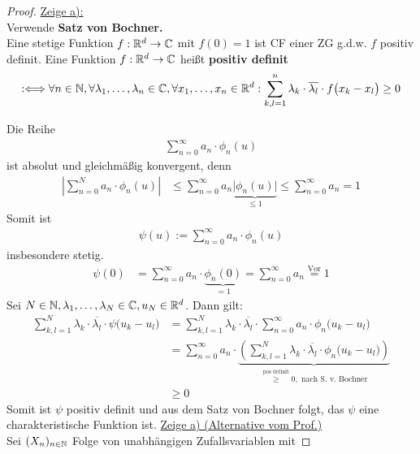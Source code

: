 \documentclass[12pt,a4paper]{article}
\begin{document}
\begin{proof}
	\underline{Zeige a):}\\
	Verwende
	\textbf{Satz von Bochner.}\\
		Eine stetige Funktion $f:\mathbb{R}^d\to\mathbb{C}$ mit $f(0)=1$ ist CF einer ZG g.d.w. $f$ positiv definit.\nl
	Eine Funktion $f:\mathbb{R}^d\to\mathbb{C}$ heißt \textbf{positiv definit}
	\begin{align*}
		:\Longleftrightarrow
		\forall n\in\mathbb{N},\forall\lambda_1,\ldots,\lambda_n\in\mathbb{C},\forall x_1,\ldots,x_n\in\mathbb{R}^d:
		\sum\limits_{k,l=1}^n\lambda_k\cdot\overline{\lambda_l}\cdot f\big(x_k-x_l\big)\geq0
	\end{align*}
	
	Die Reihe
	\begin{align*}
		\sum\limits_{n=0}^\infty a_n\cdot\phi_n(u)
	\end{align*}
	ist absolut und gleichmäßig konvergent, denn
	\begin{align*}
		\left|\sum\limits_{n=0}^N a_n\cdot\phi_n(u)\right|
		&\leq\sum\limits_{n=0}^\infty a_n\underbrace{\big|\phi_n(u)\big|}_{\leq1}
		\leq\sum\limits_{n=0}^\infty a_n=1
	\end{align*}
	Somit ist
	\begin{align*}
		\psi(u):=\sum\limits_{n=0}^\infty a_n\cdot\phi_n(u)
	\end{align*}
	insbesondere stetig.
	\begin{align*}
		\psi(0)
		&=\sum\limits_{n=0}^\infty a_n\cdot\underbrace{\phi_n(0)}_{=1}
		=\sum\limits_{n=0}^\infty a_n\overset{\text{Vor}}{=}1
	\end{align*}
	Sei $N\in\mathbb{N},\lambda_1,\ldots,\lambda_N\in\mathbb{C},u_N\in\mathbb{R}^d$.
	Dann gilt:
	\begin{align*}
		\sum\limits_{k,l=1}^N\lambda_k\cdot\overline{\lambda_l}\cdot\psi\big(u_k-u_l\big)
		&=\sum\limits_{k,l=1}^N\lambda_k\cdot\overline{\lambda_l}\cdot\sum\limits_{n=0}^\infty a_n\cdot\phi_n\big(u_k-u_l\big)\\
		&=\sum\limits_{n=0}^\infty a_n\cdot\underbrace{\left(\sum\limits_{k,l=1}^N\lambda_k\cdot\overline{\lambda_l}\cdot\phi_n\big(u_k-u_l\big)\right)}_{\overset{\text{pos definit}}{\geq}0, \text{ nach S. v. Bochner}}\\
		&\geq0
	\end{align*}		
	Somit ist $\psi$ positiv definit und aus dem Satz von Bochner folgt, das $\psi$ eine charakteristische Funktion ist.\nl
	\underline{Zeige a) (Alternative vom Prof.)}\\
	Sei $(X_n)_{n\in\mathbb{N}}$ Folge von unabhängigen Zufallsvariablen mit

\end{proof}
\end{document}
